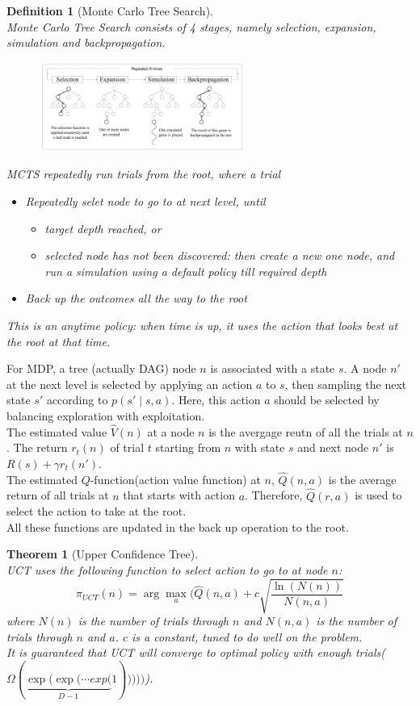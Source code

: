 \documentclass[12pt]{article}
\newtheorem{definition}{Definition}[section]
\newtheorem{theorem}{Theorem}[section]
\theoremstyle{definition}
\begin{document}
\begin{definition}[Monte Carlo Tree Search]
\hfill\\\normalfont Monte Carlo Tree Search consists of 4 stages, namely selection, expansion, simulation and backpropagation.
\begin{figure}[h]
\centering
\includegraphics[width=0.6\textwidth]{3.png}
\end{figure}
MCTS repeatedly run trials from the root, where a trial
\begin{itemize}
	\item Repeatedly selet node to go to at next level, until
	\begin{itemize}
		\item target depth reached, or
		\item selected node has not been discovered: then create a new one node, and run a simulation using a default policy till required depth
	\end{itemize}
	\item Back up the outcomes all the way to the root
\end{itemize}
This is an anytime policy: when time is up, it uses the action that looks best at the root at that time.
\end{definition}
For MDP, a tree (actually DAG) node $n$ is associated with a state $s$. A node $n'$ at the next level is selected by applying an action $a$ to $s$, then sampling the next state $s'$ according to $p(s'\mid s,a)$. Here, this action $a$ should be selected by balancing exploration with exploitation.\\
The estimated value $\hat{V}(n)$ at a node $n$ is the avergage reutn of all the trials at $n$. The return $r_t(n)$ of trial $t$ starting from $n$ with state $s$ and next node $n'$ is $R(s)+\gamma r_t(n')$.\\
The estimated $Q$-function(action value function) at $n$, $\hat{Q}(n,a)$ is the average return of all trials at $n$ that starts with action $a$. Therefore, $\hat{Q}(r,a)$ is used to select the action to take at the root.\\
All these functions are updated in the back up operation to the root.
\begin{theorem}[Upper Confidence Tree]
\hfill\\\normalfont UCT uses the following function to select action to go to at node $n$:
\[
\pi_{UCT}(n)=\arg\max_a(\hat{Q}(n,a)+c\sqrt{\frac{\ln(N(n))}{N(n,a)}}
\]
where $N(n)$ is the number of trials through $n$ and $N(n,a)$ is the number of trials through $n$ and $a$. $c$ is a constant, tuned to do well on the problem.\\
It is guaranteed that UCT will converge to optimal policy with enough trials($\Omega(\underbrace{\exp(\exp(\cdots exp(}_{D-1}1)))))$). 
\end{theorem}
\end{document}
